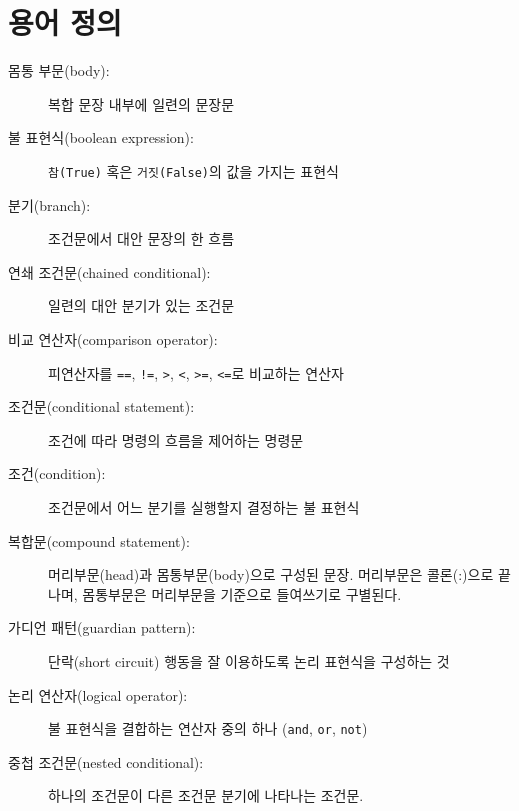 \section{용어 정의}

\begin{description}

\item[몸통 부문(body):] 복합 문장 내부에 일련의 문장문

\item[불 표현식(boolean expression):] {\tt 참(True)} 혹은 {\tt 거짓(False)}의 값을 가지는 표현식

\item[분기(branch):] 조건문에서 대안 문장의 한 흐름

\item[연쇄 조건문(chained conditional):] 일련의 대안 분기가 있는 조건문

\item[비교 연산자(comparison operator):] 피연산자를 {\tt ==}, {\tt !=}, {\tt >}, {\tt <}, {\tt >=}, {\tt <=}로 비교하는 연산자

\item[조건문(conditional statement):] 조건에 따라 명령의 흐름을 제어하는 명령문

\item[조건(condition):] 조건문에서 어느 분기를 실행할지 결정하는 불 표현식

\item[복합문(compound statement):] 머리부문(head)과 몸통부문(body)으로 구성된 문장.
머리부문은 콜론(:)으로 끝나며, 몸통부문은 머리부문을 기준으로 들여쓰기로 구별된다.

\item[가디언 패턴(guardian pattern):] 단락(short circuit) 행동을 잘 이용하도록 논리 표현식을 구성하는 것

\item[논리 연산자(logical operator):] 불 표현식을 결합하는 연산자 중의 하나 ({\tt and}, {\tt or}, {\tt not})

\item[중첩 조건문(nested conditional):] 하나의 조건문이 다른 조건문 분기에 나타나는 조건문.


\end{description}
